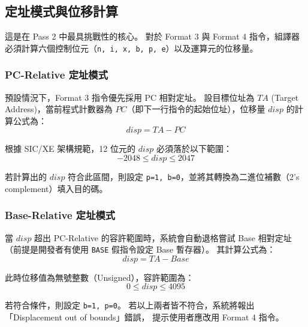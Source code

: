 \subsection{定址模式與位移計算}

這是在 Pass 2 中最具挑戰性的核心。
對於 Format 3 與 Format 4 指令，組譯器必須計算六個控制位元（\lstinline{n, i, x, b, p, e}）以及運算元的位移量。

\subsubsection{PC-Relative 定址模式}

預設情況下，Format 3 指令優先採用 PC 相對定址。
設目標位址為 $TA$ (Target Address)，當前程式計數器為 $PC$（即下一行指令的起始位址），位移量 $disp$ 的計算公式為：
$$ disp = TA - PC $$

根據 SIC/XE 架構規範，12 位元的 $disp$ 必須落於以下範圍：
$$ -2048 \le disp \le 2047 $$

若計算出的 $disp$ 符合此區間，則設定 \lstinline{p=1, b=0}，並將其轉換為二進位補數（2's complement）填入目的碼。

\subsubsection{Base-Relative 定址模式}

當 $disp$ 超出 PC-Relative 的容許範圍時，系統會自動退格嘗試 Base 相對定址
（前提是開發者有使用 \lstinline{BASE} 假指令設定 Base 暫存器）。
其計算公式為：
$$ disp = TA - Base $$

此時位移值為無號整數（Unsigned），容許範圍為：
$$ 0 \le disp \le 4095 $$

若符合條件，則設定 \lstinline{b=1, p=0}。
若以上兩者皆不符合，系統將報出「Displacement out of bounds」錯誤，
提示使用者應改用 Format 4 指令。
